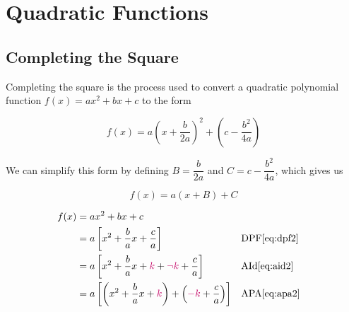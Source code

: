 
\section{Quadratic Functions}\label{Quadratic Functions}

\subsection{Completing the Square}

\begin{definition}
Completing the square is the process used to convert a quadratic polynomial function \(f(x)=ax^2+bx+c\) to the form

\[ f(x)=a \left(x+\dfrac{b}{2a} \right)^2 + \left(c-\dfrac{b^2}{4a} \right) \]

We can simplify this form by defining \(B = \dfrac{b}{2a} \) and \(C=c-\dfrac{b^2}{4a} \), which gives us 

\[ f(x)=a \left(x+B \right) + C \] 

\hfill \cite{mathworld:completethesquare}
\end{definition}

\begin{align*}
f(x) 	&= ax^2+bx+c \\
		&= a \left[x^2+ \dfrac{b}{a}x + \dfrac{c}{a} \right] && \text{DPF} \eqref{eq:dpf2} \\
		&= a \left[x^2 + \dfrac{b}{a}x + \cRed{k} + \cRed{\neg k} + \dfrac{c}{a} \right] && \text{AId} \eqref{eq:aid2} \\
		&= a \left[ \left(x^2 + \dfrac{b}{a}x + \cRed{k} \right)+ \left(\cRed{-k}+ \dfrac{c}{a}  \right) \right] && \text{APA} \eqref{eq:apa2} \\
\end{align*}

